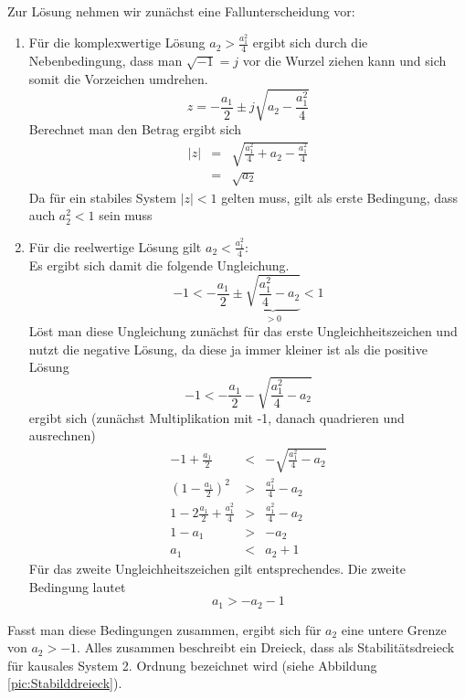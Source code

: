 Zur Lösung nehmen wir zunächst eine Fallunterscheidung vor:
\begin{enumerate}
    \item{ Für die komplexwertige Lösung $a_{2}>\frac{a_{1}^{2}}{4}$
    ergibt sich durch die Nebenbedingung, dass man $\sqrt{-1} = j$
    vor die Wurzel ziehen kann und sich somit die Vorzeichen umdrehen.
    \begin{equation}
    z=-\frac{a_{1}}{2} \pm j \sqrt{a_{2}-\frac{a_{1}^{2}}{4}}
    \end{equation}
    Berechnet man den Betrag ergibt sich
    \begin{eqnarray}
    \left|z\right| & = & \sqrt{\frac{a_{1}^{2}}{4}+a_{2}-\frac{a_{1}^{2}}{4}}\\
    & = & \sqrt{a_{2}}
    \end{eqnarray}
    Da für ein stabiles System $\left|z\right|<1$ gelten muss, gilt
    als erste Bedingung, dass auch $a^2_{2}<1$ sein muss}

    \item{Für die reelwertige Lösung gilt $a_{2}<\frac{a_{1}^{2}}{4}$:\\
    Es ergibt sich damit die folgende Ungleichung.
    \begin{equation}
        -1 < -\frac{a_{1}}{2} \pm \underbrace{\sqrt{\frac{a_{1}^{2}}{4}-a_{2}}}_{>0} < 1
    \end{equation}
    Löst man diese Ungleichung zunächst für das erste Ungleichheitszeichen und nutzt
    die negative Lösung, da diese ja immer kleiner ist als die positive Lösung
    \begin{equation}
        -1<-\frac{a_{1}}{2} - \sqrt{\frac{a_{1}^{2}}{4}-a_{2}}
    \end{equation}
    ergibt sich (zunächst Multiplikation mit -1, danach quadrieren und ausrechnen)
    \begin{eqnarray}
        -1+\frac{a_{1}}{2} & < & - \sqrt{\frac{a_{1}^{2}}{4}-a_{2}}\\
        \left(1-\frac{a_{1}}{2}\right)^{2}& > & \frac{a_{1}^{2}}{4}-a_{2}\\
        1-2\frac{a_{1}}{2}+\frac{a_{1}^{2}}{4}& > & \frac{a_{1}^{2}}{4}-a_{2}\\
        1-a_1 &  >  & -a_2 \\
        a_{1} & <  & a_{2}+1
    \end{eqnarray}
    Für das zweite Ungleichheitszeichen gilt entsprechendes. Die zweite
    Bedingung lautet
    \begin{equation}\label{eq:SOS:Ungleichung2}
    a_1 > -a_2 -1
    \end{equation}
    }
\end{enumerate}
Fasst man diese Bedingungen zusammen, ergibt sich für $a_2$ eine
untere Grenze von $a_2>-1$.
Alles zusammen beschreibt ein Dreieck, dass als Stabilitätsdreieck
für kausales System 2. Ordnung bezeichnet wird (siehe Abbildung \ref{pic:Stabilddreieck}).

